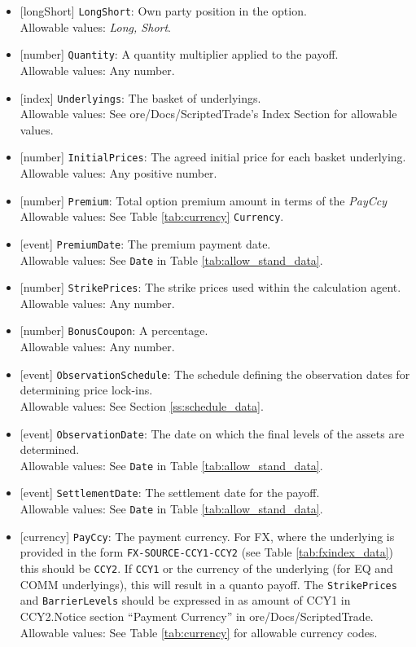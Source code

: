 \begin{itemize}
  \item{}[longShort] \lstinline!LongShort!: Own party position in the option. \\
  Allowable values: \emph{Long, Short}.
  \item{}[number] \lstinline!Quantity!: A quantity multiplier applied to the payoff. \\
  Allowable values: Any number.
  \item{}[index] \lstinline!Underlyings!: The basket of underlyings. \\
  Allowable values: See ore/Docs/ScriptedTrade's Index Section for allowable values.
  \item{}[number] \lstinline!InitialPrices!: The agreed initial price for each basket underlying. \\
  Allowable values: Any positive number.
  \item{}[number] \lstinline!Premium!: Total option premium amount in terms of the \emph{PayCcy} \\
  Allowable values: See Table \ref{tab:currency} \lstinline!Currency!.
  \item{}[event] \lstinline!PremiumDate!: The premium payment date. \\
  Allowable values: See \lstinline!Date! in Table \ref{tab:allow_stand_data}.
  \item{}[number] \lstinline!StrikePrices!: The strike prices used within the calculation agent. \\
  Allowable values: Any number.
  \item{}[number] \lstinline!BonusCoupon!: A percentage. \\
  Allowable values: Any number.
  \item{}[event] \lstinline!ObservationSchedule!: The schedule defining the observation dates for determining price lock-ins. \\
  Allowable values: See Section \ref{ss:schedule_data}.
  \item{}[event] \lstinline!ObservationDate!: The date on which the final levels of the assets are determined. \\
  Allowable values: See \lstinline!Date! in Table \ref{tab:allow_stand_data}.
  \item{}[event] \lstinline!SettlementDate!: The settlement date for the payoff. \\
  Allowable values: See \lstinline!Date! in Table \ref{tab:allow_stand_data}.
  \item{}[currency] \lstinline!PayCcy!: The payment currency. For FX, where the underlying is provided
      in the form \lstinline!FX-SOURCE-CCY1-CCY2! (see Table \ref{tab:fxindex_data}) this should
      be \lstinline!CCY2!. If \lstinline!CCY1! or the currency of the underlying (for EQ and
      COMM underlyings), this will result in a quanto payoff. The \lstinline!StrikePrices! and \lstinline!BarrierLevels! should be expressed in
      as amount of CCY1 in CCY2.Notice section ``Payment Currency'' in ore/Docs/ScriptedTrade. \\
        Allowable values: See Table \ref{tab:currency} for allowable currency codes.
\end{itemize}


